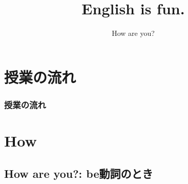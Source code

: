 \documentclass[aspectratio=169,xcolor={dvipsnames,table}]{beamer}
\title{English is fun.}
\subtitle{How are you?}
\author{}
\institute[]{}
\date[]
\begin{document}
\begin{frame}[plain]
  \titlepage
\end{frame}

\section*{授業の流れ}
\begin{frame}[plain]
  \frametitle{授業の流れ}
  \tableofcontents
\end{frame}

\section{How }
\subsection{How are you?: be動詞のとき}
\end{document}

